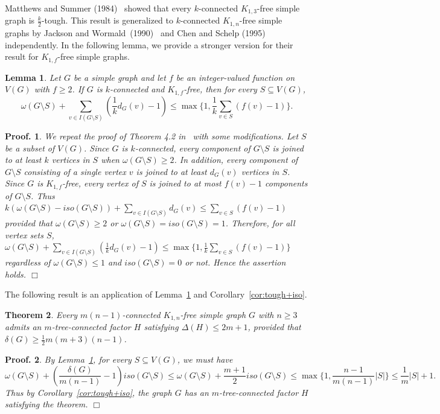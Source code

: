 \documentclass[10pt,bezier]{article}
\newtheorem{prethm}{{\bf Theorem}}[section]
\newenvironment{thm}{\begin{prethm}{\hspace{-0.5
em}{\bf.}}}{\end{prethm}}
\newtheorem{prelem}[prethm]{{\bf Lemma}}
\newenvironment{lem}{\begin{prelem}{\hspace{-0.5
em}{\bf.}}}{\end{prelem}}
\newtheorem{preproof}{{\bf Proof.}}
\newenvironment{proof}[1]{\begin{preproof}{\rm
#1}\hfill{$\Box$}}{\end{preproof}}
\begin{document}
Matthews and Summer (1984)~\cite{Matthews-Summer-1984} showed that every $k$-connected $K_{1,3}$-free 
simple graph is $\frac{k}{2}$-tough. This result is generalized to $k$-connected $K_{1,n}$-free simple graphs 
 by Jackson and Wormald~(1990)~\cite{Jackson-Wormald-1990} and Chen and Schelp (1995)~\cite{Chen-Schelp-1995} independently. 
In the following lemma, we provide a stronger version for their result for $K_{1,f}$-free simple graphs.
%
\begin{lem}\label{lem:tough+iso:star-free graphs}
{Let $G$ be a simple graph and let $f$ be an integer-valued function on $V(G)$ with $f\ge 2$.
 If $G$ is $k$-connected and $K_{1,f}$-free, then for every $S\subseteq V(G)$, 
$$ \omega(G\setminus S)+\sum _{v\in I(G\setminus S)}(\frac{1}{k}d_G(v)-1) \le \max\{1, \frac{1}{k}\sum_{v\in S}(f(v)-1)\}.$$
}\end{lem}
%
\begin{proof}
{We repeat the proof of Theorem 4.2 in~\cite{Jackson-Wormald-1990} with some modifications. 
Let $S$ be a subset of $V(G)$.
Since $G$ is $k$-connected, every component of $G\setminus S$
is joined to at least $k$ vertices in $S$ when $ \omega(G\setminus S) \ge 2$. 
In addition, every component of $G\setminus S$ consisting of a single vertex $v$ is joined to at least $d_G(v)$ vertices in $S$.
Since $G$ is $K_{1,f}$-free, every vertex of $S$ is joined to at most $f(v)-1$ components of $G\setminus S$.
Thus $k(\omega(G\setminus S)-iso(G\setminus S))+\sum _{v\in I(G\setminus S)}d_G(v)\le \sum_{v\in S}(f(v)-1)$ provided that 
 $ \omega(G\setminus S) \ge 2$ or $ \omega(G\setminus S) = iso (G\setminus S) = 1$.
Therefore, for all vertex sets $S$, $\omega(G\setminus S)+\sum _{v\in I(G\setminus S)}(\frac{1}{k}d_G(v)-1) \le 
\max\{1, \frac{1}{k}\sum_{v\in S}(f(v)-1)\}$ regardless of $\omega(G\setminus S) \le 1$ and $iso (G\setminus S)=0$ or not. Hence the assertion holds.
}\end{proof}
%
%
The following result is an application of Lemma~\ref{lem:tough+iso:star-free graphs} and Corollary~\ref{cor:tough+iso}. 
%
\begin{thm}\label{thm:star-free-graphs}
{Every $m(n-1)$-connected $K_{1,n}$-free simple graph $G$ with $n\ge 3$ admits an $m$-tree-connected factor $H$ satisfying $\Delta(H) \le 2m+1$, provided that $\delta(G)\ge \frac{1}{2}m(m+3)(n-1)$.
}\end{thm}
%
\begin{proof}
{By Lemma~\ref{lem:tough+iso:star-free graphs}, for every $S\subseteq V(G)$, we must have 
$$ \omega(G\setminus S)+(\frac{\delta(G)}{m(n-1)}-1) iso(G\setminus S)\le 
 \omega(G\setminus S)+\frac{m+1}{2}iso(G\setminus S)\le \max\{1, \frac{n-1}{m(n-1)}|S|\} \le \frac{1}{m}|S|+1.$$
Thus by Corollary~\ref{cor:tough+iso}, the graph $G$ has an $m$-tree-connected factor $H$ satisfying the theorem.
}\end{proof}
%
\end{document}

